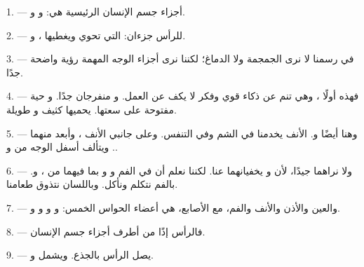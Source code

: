 
\VUsaut{4.0mm}
\VUsaut{2.0mm}

\VUsaut{2.4mm}
\VUsaut{3.0mm}

1. --- أجزاء جسم الإنسان الرئيسية هي:  و
و.

\VUsaut{3.0mm}

2. --- للرأس جزءان:  التي تحوي  ويغطيها
، و.

3. --- في رسمنا لا نرى الجمجمة ولا الدماغ؛ لكننا نرى أجزاء الوجه المهمة
رؤية واضحة جدًا.

4. --- فهذه أولًا ، وهي تنم عن ذكاء قوي وفكر لا يكف عن
العمل. و منفرجان جدًا. و حية مفتوحة على
سعتها. يحميها  كثيف و طويلة.

5. --- وهنا أيضًا  و. الأنف يخدمنا في الشم
وفي التنفس. وعلى جانبي الأنف ، وأبعد منهما .
ويتألف أسفل الوجه من  و.

6. --- ولا نراهما جيدًا، لأن  و يخفيانهما
عنا. لكننا نعلم أن في الفم  و
و بما فيهما من ، و. بالفم
نتكلم ونأكل. وباللسان نتذوق طعامنا.

7. --- والعين والأذن والأنف والفم، مع الأصابع، هي أعضاء الحواس الخمس:
 و و و
و.

8. --- فالرأس إذًا من أطرف أجزاء جسم الإنسان.

\VUsaut{4.4mm}
\VUsaut{3.0mm}

9. ---  يصل الرأس بالجذع. ويشمل 
و.

